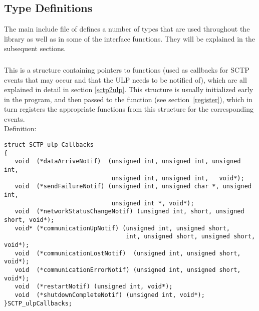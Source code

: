 \documentclass[10pt]{article}
\newcommand{\bv}{\vspace{0,1cm}\noindent \\ Definition:\footnotesize\begin{verbatim}}
\newcommand{\n}{\normalsize}
\begin{document}
\subsection{Type Definitions}
The main include file of  defines a number of types that
are used throughout the library as well as in some of the interface functions.
They will be explained in the subsequent sections.

\subsubsection{}
\label{callbacks}
This is a structure containing pointers to functions (used as callbacks for
SCTP events that may occur and that the ULP needs to be notified of), which are
all explained in detail in section \ref{sctp2ulp}.
This structure is usually initialized early in the program, and then passed
to the function  (see section~\ref{register}),
which in turn 
registers the appropriate functions from this structure for the corresponding 
events.
\bv
struct SCTP_ulp_Callbacks
{
   void  (*dataArriveNotif)  (unsigned int, unsigned int, unsigned int,
                              unsigned int, unsigned int,   void*);
   void  (*sendFailureNotif) (unsigned int, unsigned char *, unsigned int,
                              unsigned int *, void*);
   void  (*networkStatusChangeNotif) (unsigned int, short, unsigned short, void*);
   void* (*communicationUpNotif) (unsigned int, unsigned short,
                                  int, unsigned short, unsigned short, void*);
   void  (*communicationLostNotif)  (unsigned int, unsigned short, void*);
   void  (*communicationErrorNotif) (unsigned int, unsigned short, void*);
   void  (*restartNotif) (unsigned int, void*);
   void  (*shutdownCompleteNotif) (unsigned int, void*);
}SCTP_ulpCallbacks;
\end{verbatim}\n
\end{document}
